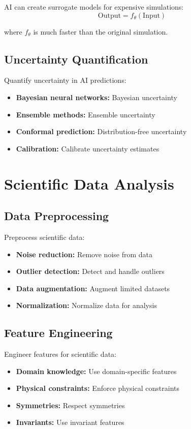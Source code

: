 AI can create surrogate models for expensive simulations:
\begin{equation}
    \text{Output} = f_\theta(\text{Input})
\end{equation}

where $f_\theta$ is much faster than the original simulation.

\subsection{Uncertainty Quantification}

Quantify uncertainty in AI predictions:
\begin{itemize}
    \item \textbf{Bayesian neural networks:} Bayesian uncertainty
    \item \textbf{Ensemble methods:} Ensemble uncertainty
    \item \textbf{Conformal prediction:} Distribution-free uncertainty
    \item \textbf{Calibration:} Calibrate uncertainty estimates
\end{itemize}

\section{Scientific Data Analysis}

\subsection{Data Preprocessing}

Preprocess scientific data:
\begin{itemize}
    \item \textbf{Noise reduction:} Remove noise from data
    \item \textbf{Outlier detection:} Detect and handle outliers
    \item \textbf{Data augmentation:} Augment limited datasets
    \item \textbf{Normalization:} Normalize data for analysis
\end{itemize}

\subsection{Feature Engineering}

Engineer features for scientific data:
\begin{itemize}
    \item \textbf{Domain knowledge:} Use domain-specific features
    \item \textbf{Physical constraints:} Enforce physical constraints
    \item \textbf{Symmetries:} Respect symmetries
    \item \textbf{Invariants:} Use invariant features
\end{itemize}

